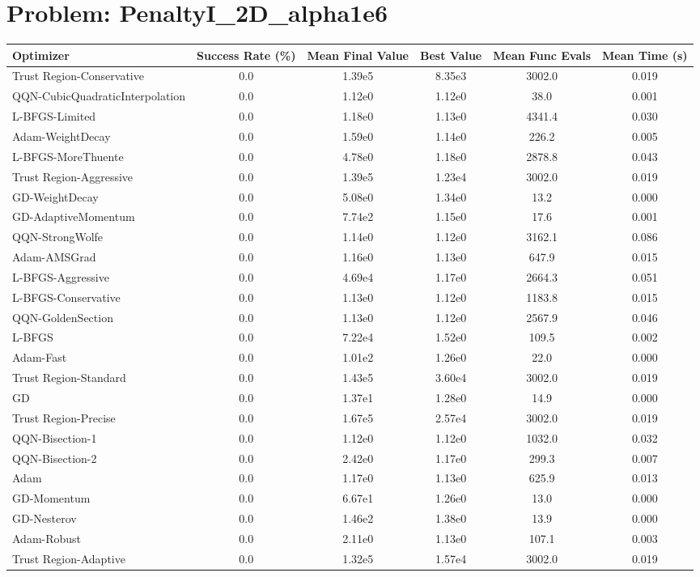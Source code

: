 \documentclass{article}
\begin{document}
\section{Problem: PenaltyI\_2D\_alpha1e6}
\begin{longtable}{p{3cm}*{5}{c}}
\toprule
\textbf{Optimizer} & \textbf{Success Rate (\%)} & \textbf{Mean Final Value} & \textbf{Best Value} & \textbf{Mean Func Evals} & \textbf{Mean Time (s)} \\
\midrule
Trust Region-Conservative & 0.0 & 1.39e5 & 8.35e3 & 3002.0 & 0.019 \\
QQN-CubicQuadraticInterpolation & 0.0 & 1.12e0 & 1.12e0 & 38.0 & 0.001 \\
L-BFGS-Limited & 0.0 & 1.18e0 & 1.13e0 & 4341.4 & 0.030 \\
Adam-WeightDecay & 0.0 & 1.59e0 & 1.14e0 & 226.2 & 0.005 \\
L-BFGS-MoreThuente & 0.0 & 4.78e0 & 1.18e0 & 2878.8 & 0.043 \\
Trust Region-Aggressive & 0.0 & 1.39e5 & 1.23e4 & 3002.0 & 0.019 \\
GD-WeightDecay & 0.0 & 5.08e0 & 1.34e0 & 13.2 & 0.000 \\
GD-AdaptiveMomentum & 0.0 & 7.74e2 & 1.15e0 & 17.6 & 0.001 \\
QQN-StrongWolfe & 0.0 & 1.14e0 & 1.12e0 & 3162.1 & 0.086 \\
Adam-AMSGrad & 0.0 & 1.16e0 & 1.13e0 & 647.9 & 0.015 \\
L-BFGS-Aggressive & 0.0 & 4.69e4 & 1.17e0 & 2664.3 & 0.051 \\
L-BFGS-Conservative & 0.0 & 1.13e0 & 1.12e0 & 1183.8 & 0.015 \\
QQN-GoldenSection & 0.0 & 1.13e0 & 1.12e0 & 2567.9 & 0.046 \\
L-BFGS & 0.0 & 7.22e4 & 1.52e0 & 109.5 & 0.002 \\
Adam-Fast & 0.0 & 1.01e2 & 1.26e0 & 22.0 & 0.000 \\
Trust Region-Standard & 0.0 & 1.43e5 & 3.60e4 & 3002.0 & 0.019 \\
GD & 0.0 & 1.37e1 & 1.28e0 & 14.9 & 0.000 \\
Trust Region-Precise & 0.0 & 1.67e5 & 2.57e4 & 3002.0 & 0.019 \\
QQN-Bisection-1 & 0.0 & 1.12e0 & 1.12e0 & 1032.0 & 0.032 \\
QQN-Bisection-2 & 0.0 & 2.42e0 & 1.17e0 & 299.3 & 0.007 \\
Adam & 0.0 & 1.17e0 & 1.13e0 & 625.9 & 0.013 \\
GD-Momentum & 0.0 & 6.67e1 & 1.26e0 & 13.0 & 0.000 \\
GD-Nesterov & 0.0 & 1.46e2 & 1.38e0 & 13.9 & 0.000 \\
Adam-Robust & 0.0 & 2.11e0 & 1.13e0 & 107.1 & 0.003 \\
Trust Region-Adaptive & 0.0 & 1.32e5 & 1.57e4 & 3002.0 & 0.019 \\
\bottomrule
\end{longtable}
\end{document}
